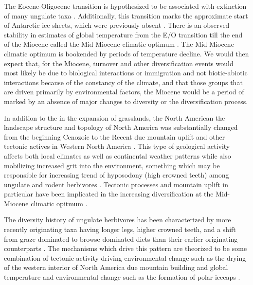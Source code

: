 \documentclass[12pt,letterpaper]{article}
\begin{document}
The Eocene-Oligocene transition is hypothesized to be associated with extinction of many ungulate taxa \citep{Janis2008a}. Additionally, this transition marks the approximate start of Antarctic ice sheets, which were previously absent \citep{Zachos2008}. There is an observed stability in estimates of global temperature from the E/O transition till the end of the Miocene called the Mid-Miocene climatic optimum \citep{Zachos2001,Zachos2008}. The Mid-Miocene climatic optimum is bookended by periods of temperature decline. We would then expect that, for the Miocene, turnover and other diversification events would most likely be due to biological interactions or immigration and not biotic-abiotic interactions because of the constancy of the climate, and that those groups that are driven primarily by environmental factors, the Miocene would be a period of marked by an absence of major changes to diversity or the diversification process.

In addition to the in the expansion of grasslands, the North American the landscape structure and topology of North America was substantially changed from the beginning Cenozoic to the Recent due mountain uplift and other tectonic actives in Western North America \citep{Blois2009,Eronen2015,Janis2008a,Badgley2013,Badgley2014,Badgley2017}. This type of geological activity affects both local climates as well as continental weather patterns while also mobilizing increased grit into the environment, something which may be responsible for increasing trend of hyposodony (high crowned teeth) among ungulate and rodent herbivores \citep{Janis1993b,Jardine2012,Jernvall2002,Damuth2011}. Tectonic processes and mountain uplift in particular have been implicated in the increasing diversification at the Mid-Miocene climatic opitmum \citep{Badgley2013,Janis2008a,Badgley2014,Badgley2010,Finarelli2010}. 


The diversity history of ungulate herbivores has been characterized by more recently originating taxa having longer legs, higher crowned teeth, and a shift from graze-dominated to browse-dominated diets than their earlier originating counterparts \citep{Janis2004,Janis2000,Janis1993b,Janis2008a,Cantalapiedra2017,Fraser2015a}. The mechanisms which drive this pattern are theorized to be some combination of tectonic activity driving environmental change such as the drying of the western interior of North America due mountain building and global temperature and environmental change such as the formation of polar icecaps \citep{Janis2008a,Eronen2015,Blois2009,Badgley2017}. 
\end{document}
